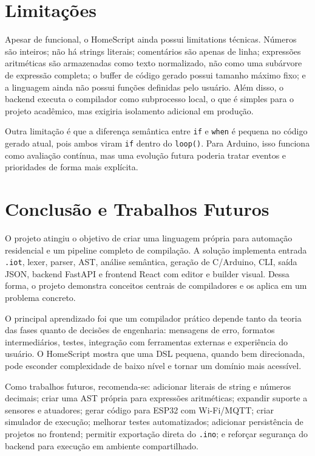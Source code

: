 \documentclass[conference]{IEEEtran}
\begin{document}
\section{Limitações}
Apesar de funcional, o HomeScript ainda possui limitations técnicas. Números são inteiros; não há strings literais; comentários são apenas de linha; expressões aritméticas são armazenadas como texto normalizado, não como uma subárvore de expressão completa; o buffer de código gerado possui tamanho máximo fixo; e a linguagem ainda não possui funções definidas pelo usuário. Além disso, o backend executa o compilador como subprocesso local, o que é simples para o projeto acadêmico, mas exigiria isolamento adicional em produção.

Outra limitação é que a diferença semântica entre \texttt{if} e \texttt{when} é pequena no código gerado atual, pois ambos viram \texttt{if} dentro do \texttt{loop()}. Para Arduino, isso funciona como avaliação contínua, mas uma evolução futura poderia tratar eventos e prioridades de forma mais explícita.

\section{Conclusão e Trabalhos Futuros}
O projeto atingiu o objetivo de criar uma linguagem própria para automação residencial e um pipeline completo de compilação. A solução implementa entrada \texttt{.iot}, lexer, parser, AST, análise semântica, geração de C/Arduino, CLI, saída JSON, backend FastAPI e frontend React com editor e builder visual. Dessa forma, o projeto demonstra conceitos centrais de compiladores e os aplica em um problema concreto.

O principal aprendizado foi que um compilador prático depende tanto da teoria das fases quanto de decisões de engenharia: mensagens de erro, formatos intermediários, testes, integração com ferramentas externas e experiência do usuário. O HomeScript mostra que uma DSL pequena, quando bem direcionada, pode esconder complexidade de baixo nível e tornar um domínio mais acessível.

Como trabalhos futuros, recomenda-se: adicionar literais de string e números decimais; criar uma AST própria para expressões aritméticas; expandir suporte a sensores e atuadores; gerar código para ESP32 com Wi-Fi/MQTT; criar simulador de execução; melhorar testes automatizados; adicionar persistência de projetos no frontend; permitir exportação direta do \texttt{.ino}; e reforçar segurança do backend para execução em ambiente compartilhado.
\end{document}
